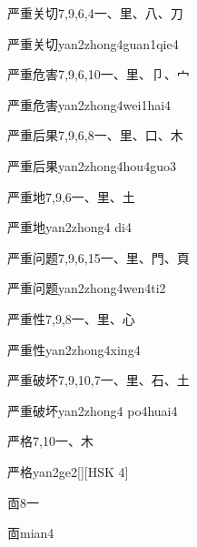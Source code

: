 \begin{entry}{严重关切}{7,9,6,4}{⼀、⾥、⼋、⼑}
  \begin{phonetics}{严重关切}{yan2zhong4guan1qie4}
  \end{phonetics}
\end{entry}

\begin{entry}{严重危害}{7,9,6,10}{⼀、⾥、⼙、⼧}
  \begin{phonetics}{严重危害}{yan2zhong4wei1hai4}
  \end{phonetics}
\end{entry}

\begin{entry}{严重后果}{7,9,6,8}{⼀、⾥、⼝、⽊}
  \begin{phonetics}{严重后果}{yan2zhong4hou4guo3}
  \end{phonetics}
\end{entry}

\begin{entry}{严重地}{7,9,6}{⼀、⾥、⼟}
  \begin{phonetics}{严重地}{yan2zhong4 di4}
  \end{phonetics}
\end{entry}

\begin{entry}{严重问题}{7,9,6,15}{⼀、⾥、⾨、⾴}
  \begin{phonetics}{严重问题}{yan2zhong4wen4ti2}
  \end{phonetics}
\end{entry}

\begin{entry}{严重性}{7,9,8}{⼀、⾥、⼼}
  \begin{phonetics}{严重性}{yan2zhong4xing4}
  \end{phonetics}
\end{entry}

\begin{entry}{严重破坏}{7,9,10,7}{⼀、⾥、⽯、⼟}
  \begin{phonetics}{严重破坏}{yan2zhong4 po4huai4}
  \end{phonetics}
\end{entry}

\begin{entry}{严格}{7,10}{⼀、⽊}
  \begin{phonetics}{严格}{yan2ge2}[][HSK 4]
  \end{phonetics}
\end{entry}

\begin{entry}{靣}{8}{⼀}
  \begin{phonetics}{靣}{mian4}
  \end{phonetics}
\end{entry}



